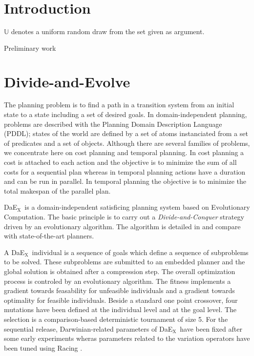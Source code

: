 \documentclass{sig-alternate}
\newcommand{\DAEX}{{\sc DaE$_{\text{X}}$}}
\def\UU{{\mathbb{U}}}
\begin{document}
\section{Introduction}

$\UU$ denotes a uniform random draw from the set given as argument.


Preliminary work

\section{Divide-and-Evolve}

The planning problem is to find a path in a transition system from an initial state to a state including a set of desired goals. In domain-independent planning, problems are described with the Planning Domain Description Language (PDDL); states of the world are defined by a set of atoms instanciated from a set of predicates and a set of objects. Although there are several families of problems, we concentrate here on cost planning and temporal planning. In cost planning a cost is attached to each action and the objective is to minimize the sum of all costs for a sequential plan whereas in temporal planning actions have a duration and can be run in parallel. In temporal planning the objective is to minimize the total makespan of the parallel plan.

\DAEX\ is a domain-independent satisficing planning system \cite{dae:evocop2006} based on Evolutionary Computation. The basic principle is to carry out a {\em Divide-and-Conquer} strategy driven by an evolutionary algorithm. The algorithm is detailed in \cite{dae:icaps2010} and compare with state-of-the-art planners.

A \DAEX\ individual is a sequence of goals which define a sequence of subproblems to be solved. These subproblems are submitted to an embedded planner and the global solution is obtained after a compression step. The overall optimization process is controled by an evolutionary algorithm.
The fitness implements a gradient towards feasability for unfeasible individuals and a gradient towards optimality for feasible individuals.
Beside a standard one point crossover, four mutations have been defined at the individual level and at the goal level.
The selection is a comparison-based deterministic tournament of size 5.
For the sequential release, Darwinian-related parameters of \DAEX\ have been fixed after some early experiments \cite{dae:evocop2006} wheras 
parameters related to the variation operators have been tuned using Racing \cite{dae:gecco2010}.
\end{document}
